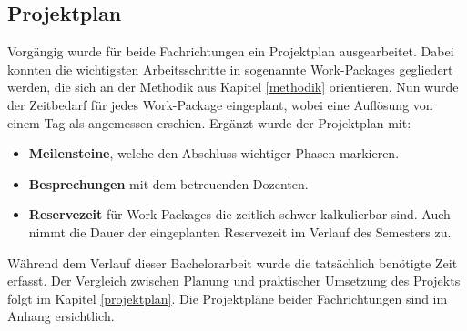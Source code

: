 \subsection{Projektplan}
Vorgängig wurde für beide Fachrichtungen ein Projektplan ausgearbeitet. Dabei konnten die wichtigsten Arbeitsschritte in sogenannte Work-Packages gegliedert werden, die sich an der Methodik aus Kapitel \ref{methodik} orientieren. Nun wurde der Zeitbedarf für jedes Work-Package eingeplant, wobei eine Auflösung von einem Tag als angemessen erschien. Ergänzt wurde der Projektplan mit:

\begin{itemize}
	\item \textbf{Meilensteine}, welche den Abschluss wichtiger Phasen markieren.
	
	\item \textbf{Besprechungen} mit dem betreuenden Dozenten.
	
	\item \textbf{Reservezeit} für Work-Packages die zeitlich schwer kalkulierbar sind. Auch nimmt die Dauer der eingeplanten Reservezeit im Verlauf des Semesters zu.
	
\end{itemize}

Während dem Verlauf dieser Bachelorarbeit wurde die tatsächlich benötigte Zeit erfasst. Der Vergleich zwischen Planung und praktischer Umsetzung des Projekts folgt im Kapitel  \ref{projektplan}. Die Projektpläne beider Fachrichtungen sind im Anhang ersichtlich. 